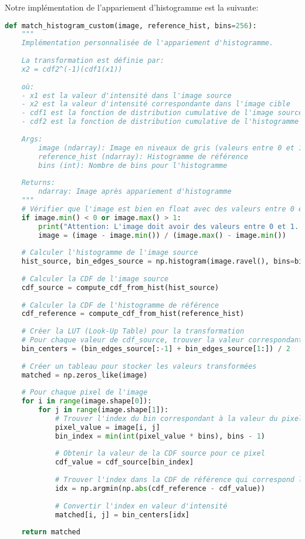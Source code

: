 \documentclass[12pt,a4paper]{article}
\begin{document}
Notre implémentation de l'appariement d'histogramme est la suivante:

\begin{lstlisting}[language=Python, caption=Implémentation de l'appariement d'histogramme]
def match_histogram_custom(image, reference_hist, bins=256):
    """
    Implémentation personnalisée de l'appariement d'histogramme.
    
    La transformation est définie par:
    x2 = cdf2^(-1)(cdf1(x1))
    
    où:
    - x1 est la valeur d'intensité dans l'image source
    - x2 est la valeur d'intensité correspondante dans l'image cible
    - cdf1 est la fonction de distribution cumulative de l'image source
    - cdf2 est la fonction de distribution cumulative de l'histogramme modèle
    
    Args:
        image (ndarray): Image en niveaux de gris (valeurs entre 0 et 1)
        reference_hist (ndarray): Histogramme de référence
        bins (int): Nombre de bins pour l'histogramme
        
    Returns:
        ndarray: Image après appariement d'histogramme
    """
    # Vérifier que l'image est bien en float avec des valeurs entre 0 et 1
    if image.min() < 0 or image.max() > 1:
        print("Attention: L'image doit avoir des valeurs entre 0 et 1. Normalisation appliquée.")
        image = (image - image.min()) / (image.max() - image.min())
    
    # Calculer l'histogramme de l'image source
    hist_source, bin_edges_source = np.histogram(image.ravel(), bins=bins, range=(0, 1))
    
    # Calculer la CDF de l'image source
    cdf_source = compute_cdf_from_hist(hist_source)
    
    # Calculer la CDF de l'histogramme de référence
    cdf_reference = compute_cdf_from_hist(reference_hist)
    
    # Créer la LUT (Look-Up Table) pour la transformation
    # Pour chaque valeur de cdf_source, trouver la valeur correspondante dans cdf_reference
    bin_centers = (bin_edges_source[:-1] + bin_edges_source[1:]) / 2
    
    # Créer un tableau pour stocker les valeurs transformées
    matched = np.zeros_like(image)
    
    # Pour chaque pixel de l'image
    for i in range(image.shape[0]):
        for j in range(image.shape[1]):
            # Trouver l'index du bin correspondant à la valeur du pixel
            pixel_value = image[i, j]
            bin_index = min(int(pixel_value * bins), bins - 1)
            
            # Obtenir la valeur de la CDF source pour ce pixel
            cdf_value = cdf_source[bin_index]
            
            # Trouver l'index dans la CDF de référence qui correspond le mieux à cette valeur
            idx = np.argmin(np.abs(cdf_reference - cdf_value))
            
            # Convertir l'index en valeur d'intensité
            matched[i, j] = bin_centers[idx]
    
    return matched
\end{lstlisting}
\end{document}
